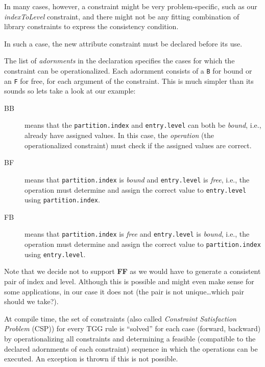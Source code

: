 In many cases, however, a constraint might be very problem-specific, such as our \emph{indexToLevel} constraint, and there might not be any fitting combination
of library constraints to express the consistency condition.

In such a case, the new attribute constraint must be declared before its use.

The list of \emph{adornments} in the declaration specifies the cases for which the constraint can be operationalized. Each adornment consists of a \texttt{B}
for bound or an \texttt{F} for free, for each argument of the constraint. This is much simpler than its sounds so lets take a look at our example:

\begin{description}

\item[BB] means that the \texttt{partition.index} and \texttt{entry.level} can both be \emph{bound}, i.e., already have assigned values.
In this case, the \emph{operation} (the operationalized constraint) must check if the assigned values are correct.

\item[BF] means that \texttt{partition.index} is \emph{bound} and \texttt{entry.level} is \emph{free}, i.e., the operation must determine and assign the correct
value to \texttt{entry.level} using \texttt{partition.index}.

\item[FB] means that \texttt{partition.index} is \emph{free} and \texttt{entry.level} is \emph{bound}, i.e., the operation must determine and assign the correct
value to \texttt{parti\-tion.in\-dex} using \texttt{entry.level}.

\end{description}

Note that we decide not to support \textbf{FF} as we would have to generate a consistent pair of index and level.
Although this is possible and might even make sense for some applications, in our case it does not (the pair is not unique\ldots which pair should we take?).

At compile time, the set of constraints (also called \emph{Constraint Satisfaction Problem} (CSP)) for every TGG rule is ``solved'' for each case (forward,
backward) by operationalizing all constraints and determining a feasible (compatible to the declared adornments of each constraint) sequence in which the
operations can be executed. An exception is thrown if this is not possible.
